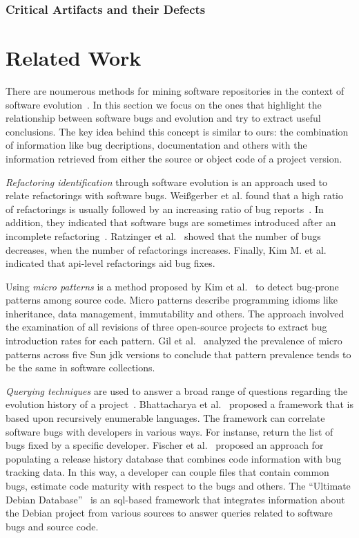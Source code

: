 \documentclass[conference]{IEEEtran}
\begin{document}
\subsubsection{Critical Artifacts and their Defects}

\section{Related Work}
\label{sec:rel}

There are noumerous methods for mining software repositories in the context
of software evolution~\cite{KCM07}. In this section we focus on the ones
that highlight the relationship between software bugs and evolution and try to
extract useful conclusions. The key idea behind this concept is
similar to ours: the combination of information like bug decriptions,
documentation and others with the information retrieved from either the source
or object code of a project version.

{\it Refactoring identification} through software evolution is an approach used to
relate refactorings with software bugs. Wei{\ss}gerber et al. found that a high
ratio of refactorings is usually followed by an increasing ratio of bug
reports~\cite{WD06}. In addition, they indicated that software bugs are sometimes introduced
after an incomplete refactoring~\cite{GW05}.
Ratzinger et al.~\cite{RSG08} showed that the number of bugs decreases, when the number of
refactorings increases. Finally, Kim M. et al.~\cite{KCK11} indicated that {\sc api}-level
refactorings aid bug fixes.

Using {\it micro patterns} is a method proposed by Kim et al.~\cite{KPW06}
to detect bug-prone patterns among source code. Micro patterns describe programming
idioms like inheritance, data management, immutability and others. The approach involved
the examination of all revisions of three open-source projects to extract bug
introduction rates for each pattern. Gil et al.~\cite{GM05} analyzed the
prevalence of micro patterns across five Sun {\sc jdk} versions to conclude that
pattern prevalence tends to be the same in software collections.

{\it Querying techniques} are used to answer a broad range of questions
regarding the evolution history of a project~\cite{HG05}. Bhattacharya et
al.~\cite{BN11, B11} proposed a framework that is based upon
recursively enumerable languages. The framework can correlate software
bugs with developers in various ways. For instanse, return the list of
bugs fixed by a specific developer. Fischer et al.~\cite{FPG03} proposed
an approach for populating a release history database that combines code
information with bug tracking data. In this way, a developer can couple files
that contain common bugs, estimate code maturity with respect to the bugs
and others. The ``Ultimate Debian Database''~\cite{NZ10} is an {\sc sql}-based
framework that integrates information about the Debian project from various
sources to answer queries related to software bugs and source code.
\end{document}
